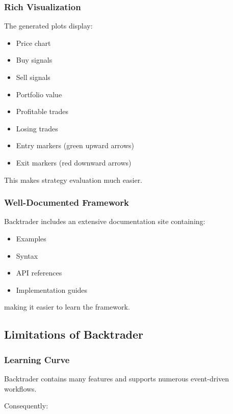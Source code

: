 \documentclass[12pt,openany]{book}
\begin{document}
\subsubsection{Rich Visualization}

The generated plots display:

\begin{itemize}[leftmargin=*]
    \item Price chart
    \item Buy signals
    \item Sell signals
    \item Portfolio value
    \item Profitable trades
    \item Losing trades
    \item Entry markers (green upward arrows)
    \item Exit markers (red downward arrows)
\end{itemize}

This makes strategy evaluation much easier.

\subsubsection{Well-Documented Framework}

Backtrader includes an extensive documentation site containing:

\begin{itemize}[leftmargin=*]
    \item Examples
    \item Syntax
    \item API references
    \item Implementation guides
\end{itemize}

making it easier to learn the framework.

\subsection{Limitations of Backtrader}

\subsubsection{Learning Curve}

Backtrader contains many features and supports numerous event-driven workflows.

Consequently:
\end{document}

